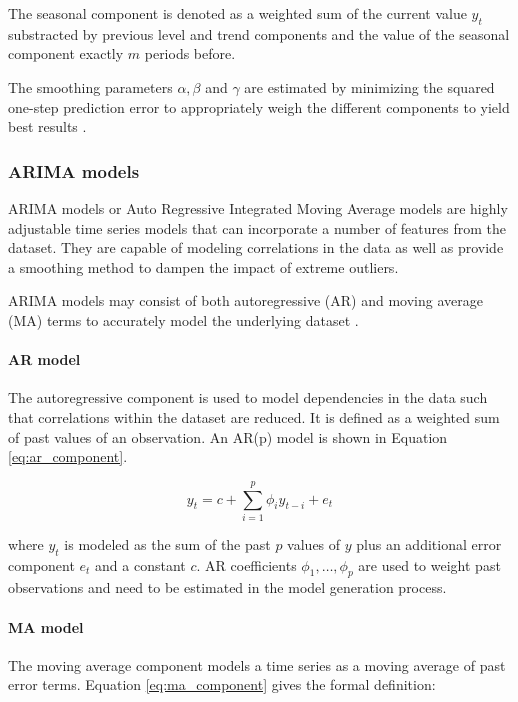 The seasonal component is denoted as a weighted sum of the current value $y_t$ substracted by previous level and trend components and the value of the seasonal component exactly $m$ periods before. 

The smoothing parameters $\alpha, \beta$ and $\gamma$ are estimated by minimizing the squared one-step prediction error to appropriately weigh the different components to yield best results \cite{r2016language}. 


\subsubsection{ARIMA models}

ARIMA models or Auto Regressive Integrated Moving Average models are highly adjustable time series models that can incorporate a number of features from the dataset. They are capable of modeling correlations in the data as well as provide a smoothing method to dampen the impact of extreme outliers. 

ARIMA models may consist of both autoregressive (AR) and moving average (MA) terms to accurately model the underlying dataset \cite{hyndman2012forecasting,weron2007modeling}. 

\paragraph{AR model} The autoregressive component is used to model dependencies in the data such that correlations within the dataset are reduced. It is defined as a weighted sum of past values of an observation. An AR(p) model is shown in Equation \ref{eq:ar_component}.

\begin{equation}
	y_t = c + \sum_{i=1}^p \phi_i y_{t-i} + e_t
\label{eq:ar_component}
\end{equation}

where $y_t$ is modeled as the sum of the past $p$ values of $y$ plus an additional error component $e_t$ and a constant $c$. AR coefficients $\phi_1,\ldots,\phi_p$ are used to weight past observations and need to be estimated in the model generation process. 

\paragraph{MA model} The moving average component models a time series as a moving average of past error terms. Equation \ref{eq:ma_component} gives the formal definition: 

